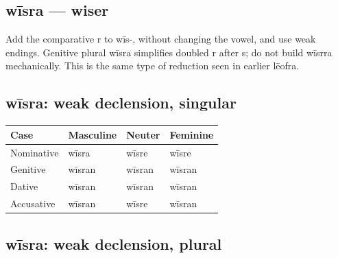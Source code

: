 \subsection*{wīsra — wiser}

Add the comparative r to wīs-, without changing the vowel, and use weak endings. Genitive plural wīsra simplifies doubled r after s; do not build wīsrra mechanically. This is the same type of reduction seen in earlier lēofra.

\subsection*{wīsra: weak declension, singular}

\par\begingroup
\fontsize{10.5}{13.2}\selectfont
\setlength{\LTleft}{0pt}\setlength{\LTright}{\fill}
\noindent
\begin{tabular}{@{}>{\raggedright\arraybackslash}p{28.89mm}>{\raggedright\arraybackslash}p{28.89mm}>{\raggedright\arraybackslash}p{28.89mm}>{\raggedright\arraybackslash}p{28.89mm}@{}}
\toprule
\textbf{Case} & \textbf{Masculine} & \textbf{Neuter} & \textbf{Feminine} \\
\midrule
Nominative & wīsra & wīsre & wīsre \\
Genitive & wīsran & wīsran & wīsran \\
Dative & wīsran & wīsran & wīsran \\
Accusative & wīsran & wīsre & wīsran \\
\bottomrule
\end{tabular}
\par\endgroup

\subsection*{wīsra: weak declension, plural}

